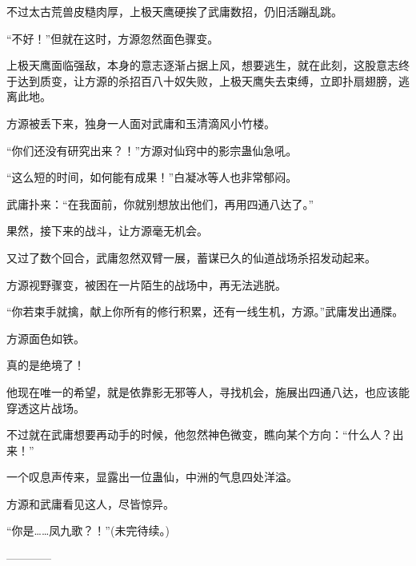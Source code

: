 \begin{this_body}
不过太古荒兽皮糙肉厚，上极天鹰硬挨了武庸数招，仍旧活蹦乱跳。

“不好！”但就在这时，方源忽然面色骤变。

上极天鹰面临强敌，本身的意志逐渐占据上风，想要逃生，就在此刻，这股意志终于达到质变，让方源的杀招百八十奴失败，上极天鹰失去束缚，立即扑扇翅膀，逃离此地。

方源被丢下来，独身一人面对武庸和玉清滴风小竹楼。

“你们还没有研究出来？！”方源对仙窍中的影宗蛊仙急吼。

“这么短的时间，如何能有成果！”白凝冰等人也非常郁闷。

武庸扑来：“在我面前，你就别想放出他们，再用四通八达了。”

果然，接下来的战斗，让方源毫无机会。

又过了数个回合，武庸忽然双臂一展，蓄谋已久的仙道战场杀招发动起来。

方源视野骤变，被困在一片陌生的战场中，再无法逃脱。

“你若束手就擒，献上你所有的修行积累，还有一线生机，方源。”武庸发出通牒。

方源面色如铁。

真的是绝境了！

他现在唯一的希望，就是依靠影无邪等人，寻找机会，施展出四通八达，也应该能穿透这片战场。

不过就在武庸想要再动手的时候，他忽然神色微变，瞧向某个方向：“什么人？出来！”

一个叹息声传来，显露出一位蛊仙，中洲的气息四处洋溢。

方源和武庸看见这人，尽皆惊异。

“你是……凤九歌？！”(未完待续。)

------------

\end{this_body}

